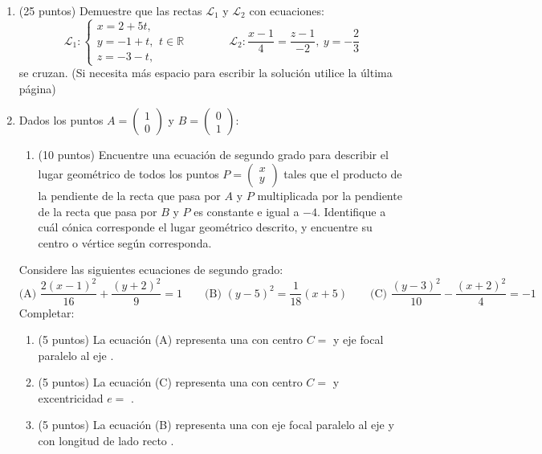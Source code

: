\documentclass[11pt]{article}
\newcommand{\vect}[2]{\begin{pmatrix}#1\\#2\end{pmatrix}}
\begin{document}
\begin{enumerate}
\item (25 puntos) Demuestre que las rectas $\mathcal{L}_1$ y $\mathcal{L}_2$ con ecuaciones:
$$\mathcal{L}_1:\begin{cases}x=2+5t,\\ y=-1+t,\\ z=-3-t,\end{cases} t\in\mathbb{R}\qquad\qquad \mathcal{L}_2:\frac{x-1}{4}=\frac{z-1}{-2},\ y=-\frac{2}{3}$$
se cruzan. (Si necesita más espacio para escribir la solución utilice la última página)

\item Dados los puntos $A=\vect{1}{0}$ y $B=\vect{0}{1}$:

\begin{enumerate}[label=(\alph*)]
\item (10 puntos) Encuentre una ecuación de segundo grado para describir el lugar geométrico de todos los puntos $P=\vect{x}{y}$ tales que el producto de la pendiente de la recta que pasa por $A$ y $P$ multiplicada por la pendiente de la recta que pasa por $B$ y $P$ es constante e igual a $-4$. Identifique a cuál cónica corresponde el lugar geométrico descrito, y encuentre su centro o vértice según corresponda.
\end{enumerate}

Considere las siguientes ecuaciones de segundo grado:
$$\text{(A) } \frac{2(x-1)^2}{16}+\frac{(y+2)^2}{9}=1 \qquad \text{(B) } (y-5)^2=\frac{1}{18}(x+5) \qquad \text{(C) } \frac{(y-3)^2}{10}-\frac{(x+2)^2}{4}=-1$$
Completar:

\begin{enumerate}[label=(\roman*)]
\item (5 puntos) La ecuación (A) representa una \underline{\hspace{2.5cm}} con centro $C=$ \underline{\hspace{1.5cm}} y eje focal paralelo al eje \underline{\hspace{1cm}}.
\item (5 puntos) La ecuación (C) representa una \underline{\hspace{2.5cm}} con centro $C=$ \underline{\hspace{1.5cm}} y excentricidad $e=$ \underline{\hspace{1.5cm}}.
\item (5 puntos) La ecuación (B) representa una \underline{\hspace{2.5cm}} con eje focal paralelo al eje \underline{\hspace{1cm}} y con longitud de lado recto \underline{\hspace{1.5cm}}.
\end{enumerate}


\end{enumerate}
\end{document}
